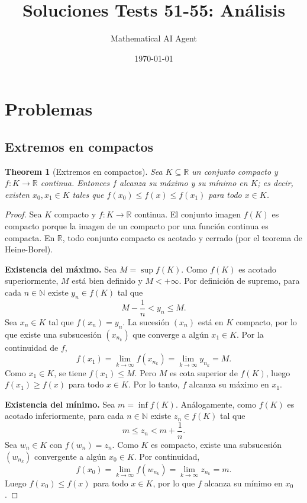 \documentclass[11pt,a4paper]{article}
\title{Soluciones Tests 51-55: Análisis}
\author{Mathematical AI Agent}
\date{\today}
\theoremstyle{plain}
\newtheorem{theorem}{Theorem}[section]
\theoremstyle{definition}
\begin{document}
\maketitle
\section{Problemas}

\subsection{Extremos en compactos}

\begin{theorem}[Extremos en compactos]
Sea $K \subseteq \mathbb{R}$ un conjunto compacto y $f : K \to \mathbb{R}$ continua. Entonces $f$ alcanza su máximo y su mínimo en $K$; es decir, existen $x_0, x_1 \in K$ tales que $f(x_0) \leq f(x) \leq f(x_1)$ para todo $x \in K$.
\end{theorem}

\begin{proof}
Sea $K$ compacto y $f : K \to \mathbb{R}$ continua. El conjunto imagen $f(K)$ es compacto porque la imagen de un compacto por una función continua es compacta. En $\mathbb{R}$, todo conjunto compacto es acotado y cerrado (por el teorema de Heine-Borel).

\medskip
\textbf{Existencia del máximo.} Sea $M = \sup f(K)$. Como $f(K)$ es acotado superiormente, $M$ está bien definido y $M < +\infty$. Por definición de supremo, para cada $n \in \mathbb{N}$ existe $y_n \in f(K)$ tal que
\[
M - \frac{1}{n} < y_n \leq M.
\]
Sea $x_n \in K$ tal que $f(x_n) = y_n$. La sucesión $(x_n)$ está en $K$ compacto, por lo que existe una subsucesión $(x_{n_k})$ que converge a algún $x_1 \in K$. Por la continuidad de $f$,
\[
f(x_1) = \lim_{k \to \infty} f(x_{n_k}) = \lim_{k \to \infty} y_{n_k} = M.
\]
Como $x_1 \in K$, se tiene $f(x_1) \leq M$. Pero $M$ es cota superior de $f(K)$, luego $f(x_1) \geq f(x)$ para todo $x \in K$. Por lo tanto, $f$ alcanza su máximo en $x_1$.

\medskip
\textbf{Existencia del mínimo.} Sea $m = \inf f(K)$. Análogamente, como $f(K)$ es acotado inferiormente, para cada $n \in \mathbb{N}$ existe $z_n \in f(K)$ tal que
\[
m \leq z_n < m + \frac{1}{n}.
\]
Sea $w_n \in K$ con $f(w_n) = z_n$. Como $K$ es compacto, existe una subsucesión $(w_{n_k})$ convergente a algún $x_0 \in K$. Por continuidad,
\[
f(x_0) = \lim_{k \to \infty} f(w_{n_k}) = \lim_{k \to \infty} z_{n_k} = m.
\]
Luego $f(x_0) \leq f(x)$ para todo $x \in K$, por lo que $f$ alcanza su mínimo en $x_0$.
\end{proof}
\end{document}
